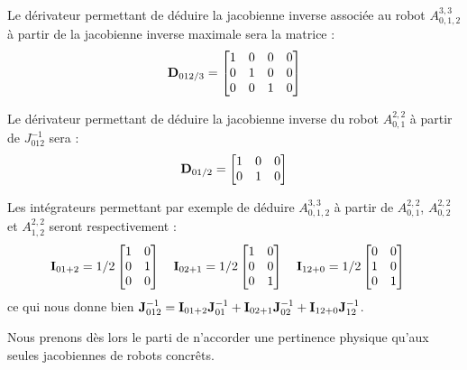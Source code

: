 Le d\'erivateur permettant de d\'eduire la jacobienne inverse associ\'ee au 
robot $A^{3,3}_{0, 1, 2}$ \`a partir de la jacobienne inverse maximale 
sera la matrice :
\begin{equation}
{\bf D}_{012/3} = 
\begin{bmatrix}
1 & 0 & 0 & 0\\
0 & 1 & 0 & 0\\
0 & 0 & 1 & 0
\end{bmatrix}
\label{chap01:eq02}
\end{equation}

Le d\'erivateur permettant de d\'eduire la jacobienne inverse du robot 
$A^{2,2}_{0, 1}$ \`a partir de $J^{-1}_{012}$ sera :
\begin{equation}
{\bf D}_{01/2} = 
\begin{bmatrix}
1 & 0 & 0\\
0 & 1 & 0
\end{bmatrix}
\label{chap01:eq03}
\end{equation}

Les int\'egrateurs permettant par exemple de d\'eduire $A^{3,3}_{0, 1, 2}$ \`a 
partir de $A^{2,2}_{0, 1}$, $A^{2,2}_{0, 2}$ et $A^{2,2}_{1,2}$ seront 
respectivement :
\begin{equation}
{\bf I}_{01+2} = 1/2
\begin{bmatrix}
1 & 0 \\
0 & 1 \\
0 & 0
\end{bmatrix}
\quad
{\bf I}_{02+1} = 1/2
\begin{bmatrix}
1 & 0 \\
0 & 0 \\
0 & 1
\end{bmatrix}
\quad
{\bf I}_{12+0} = 1/2
\begin{bmatrix}
0 & 0 \\
1 & 0 \\
0 & 1
\end{bmatrix}
\label{chap01:eq04} \quad
\end{equation}
ce qui nous donne bien ${\bf J}^{-1}_{012} = {\bf I}_{01+2} {\bf J}^{-1}_{01} + 
{\bf I}_{02+1} {\bf J}^{-1}_{02} + {\bf I}_{12+0} {\bf J}^{-1}_{12}$.

Nous prenons d\`es lors le parti de n'accorder une pertinence physique qu'aux 
seules jacobiennes de robots concr\^ets.

